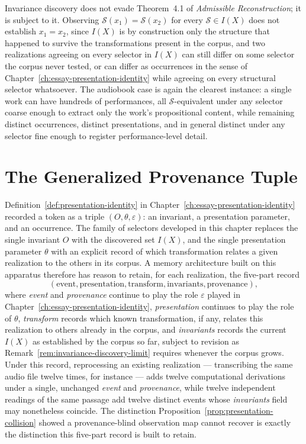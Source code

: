 \begin{remark}
\label{rem:invariance-discovery-limit}
Invariance discovery does not evade Theorem~4.1 of \emph{Admissible Reconstruction}; it is subject to it. Observing $\mathcal{S}(x_1) = \mathcal{S}(x_2)$ for every $\mathcal{S} \in I(X)$ does not establish $x_1 = x_2$, since $I(X)$ is by construction only the structure that happened to survive the transformations present in the corpus, and two realizations agreeing on every selector in $I(X)$ can still differ on some selector the corpus never tested, or can differ as occurrences in the sense of Chapter~\ref{ch:essay-presentation-identity} while agreeing on every structural selector whatsoever. The audiobook case is again the clearest instance: a single work can have hundreds of performances, all $\mathcal{S}$-equivalent under any selector coarse enough to extract only the work's propositional content, while remaining distinct occurrences, distinct presentations, and in general distinct under any selector fine enough to register performance-level detail.
\end{remark}

\section{The Generalized Provenance Tuple}

Definition~\ref{def:presentation-identity} in Chapter~\ref{ch:essay-presentation-identity} recorded a token as a triple $(O, \theta, \varepsilon)$: an invariant, a presentation parameter, and an occurrence. The family of selectors developed in this chapter replaces the single invariant $O$ with the discovered set $I(X)$, and the single presentation parameter $\theta$ with an explicit record of which transformation relates a given realization to the others in its corpus. A memory architecture built on this apparatus therefore has reason to retain, for each realization, the five-part record
\[
(\text{event}, \text{presentation}, \text{transform}, \text{invariants}, \text{provenance}),
\]
where \emph{event} and \emph{provenance} continue to play the role $\varepsilon$ played in Chapter~\ref{ch:essay-presentation-identity}, \emph{presentation} continues to play the role of $\theta$, \emph{transform} records which known transformation, if any, relates this realization to others already in the corpus, and \emph{invariants} records the current $I(X)$ as established by the corpus so far, subject to revision as Remark~\ref{rem:invariance-discovery-limit} requires whenever the corpus grows. Under this record, reprocessing an existing realization --- transcribing the same audio file twelve times, for instance --- adds twelve computational derivations under a single, unchanged \emph{event} and \emph{provenance}, while twelve independent readings of the same passage add twelve distinct events whose \emph{invariants} field may nonetheless coincide. The distinction Proposition~\ref{prop:presentation-collision} showed a provenance-blind observation map cannot recover is exactly the distinction this five-part record is built to retain.


